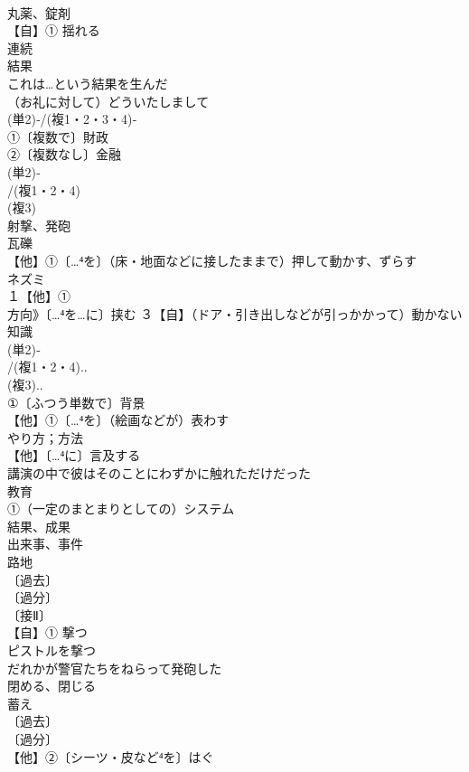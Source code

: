 \documentclass[8pt]{extreport}
\begin{document}
\begin{CJK}{UTF8}{min}
\\	丸薬、錠剤
\\	【自】① 揺れる 
\\	連続　
\\	結果　
\\	これは…という結果を生んだ
\\	（お礼に対して）どういたしまして
\\	(単2)‐/(複1・2・3・4)‐
\\	①〔複数で〕財政
\\	②〔複数なし〕金融
\\	(単2)‐
\\	/(複1・2・4)
\\	(複3)
\\	射撃、発砲
\\	瓦礫
\\	【他】①〔…⁴を〕（床・地面などに接したままで）押して動かす、ずらす
\\	ネズミ
\\	１【他】①
\\	方向》〔…⁴を…に〕挟む ３【自】（ドア・引き出しなどが引っかかって）動かない
\\	知識 
\\	(単2)‐
\\	/(複1・2・4)..
\\	(複3)..
\\	①〔ふつう単数で〕背景
\\	【他】①〔…⁴を〕（絵画などが）表わす
\\	やり方；方法
\\	【他】〔…⁴に〕言及する
\\	講演の中で彼はそのことにわずかに触れただけだった
\\	教育
\\	①（一定のまとまりとしての）システム
\\	結果、成果
\\	出来事、事件
\\	路地 
\\	〔過去〕
\\	〔過分〕
\\	〔接Ⅱ〕
\\	【自】① 撃つ
\\	ピストルを撃つ 
\\	だれかが警官たちをねらって発砲した 
\\	閉める、閉じる
\\	蓄え 
\\	〔過去〕
\\	〔過分〕
\\	【他】②〔シーツ・皮など⁴を〕はぐ 

\end{CJK}
\end{document}
